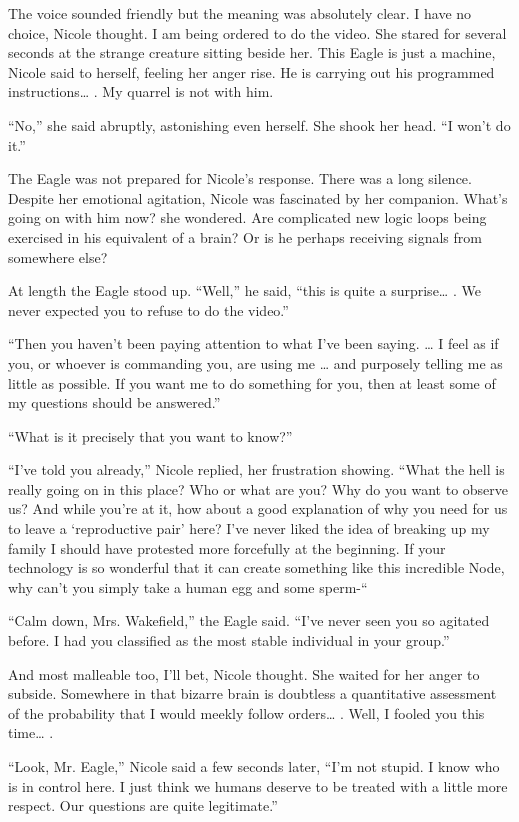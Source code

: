 \documentclass[]{article}
\begin{document}
{The voice sounded friendly but the meaning was absolutely clear.  I have no choice, Nicole thought.  I am being ordered to do the video.  She stared for several seconds at the strange creature sitting beside her.  This Eagle is just a machine, Nicole said to herself, feeling her anger rise.  He is carrying out his programmed instructions… .  My quarrel is not with him.

“No,” she said abruptly, astonishing even herself.  She shook her head.  “I won’t do it.”

The Eagle was not prepared for Nicole’s response.  There was a long silence.  Despite her emotional agitation, Nicole was fascinated by her companion.  What’s going on with him now? she wondered.  Are complicated new logic loops being exercised in his equivalent of a brain? Or is he perhaps receiving signals from somewhere else?

At length the Eagle stood up.  “Well,” he said, “this is quite a surprise… .  We never expected you to refuse to do the video.”

“Then you haven’t been paying attention to what I’ve been saying.  … I feel as if you, or whoever is commanding you, are using me … and purposely telling me as little as possible.  If you want me to do something for you, then at least some of my questions should be answered.”

“What is it precisely that you want to know?”

“I’ve told you already,” Nicole replied, her frustration showing.  “What the hell is really going on in this place? Who or what are you? Why do you want to observe us? And while you’re at it, how about a good explanation of why you need for us to leave a ‘reproductive pair’ here? I’ve never liked the idea of breaking up my family I should have protested more forcefully at the beginning.  If your technology is so wonderful that it can create something like this incredible Node, why can’t you simply take a human egg and some sperm-“

“Calm down, Mrs.  Wakefield,” the Eagle said.  “I’ve never seen you so agitated before.  I had you classified as the most stable individual in your group.”

And most malleable too, I’ll bet, Nicole thought.  She waited for her anger to subside.  Somewhere in that bizarre brain is doubtless a quantitative assessment of the probability that I would meekly follow orders… .  Well, I fooled you this time… .

“Look, Mr.  Eagle,” Nicole said a few seconds later, “I’m not stupid.  I know who is in control here.  I just think we humans deserve to be treated with a little more respect.  Our questions are quite legitimate.”

}
\end{document}
